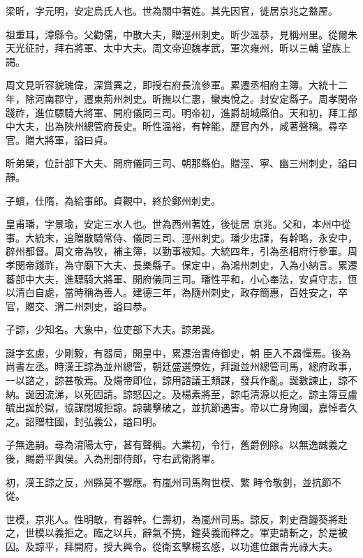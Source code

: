 \begin{pinyinscope}
 梁昕，字元明，安定烏氏人也。世為關中著姓。其先因官，徙居京兆之盩厔。



 祖重耳，漳縣令。父勸儒，中散大夫，贈涇州刺史。昕少溫恭，見稱州里。從爾朱天光征討，拜右將軍、太中大夫。周文帝迎魏孝武，軍次雍州，昕以三輔
 望族上謁。



 周文見昕容貌瑰偉，深賞異之，即授右府長流參軍。累遷丞相府主簿。大統十二年，除河南郡守，遷東荊州刺史。昕撫以仁惠，蠻夷悅之。封安定縣子。周孝閔帝踐祚，進位驃騎大將軍、開府儀同三司。明帝初，進爵胡城縣伯。天和初，拜工部中大夫，出為陜州總管府長史。昕性溫裕，有幹能，歷官內外，咸著聲稱。尋卒官。贈大將軍，謚曰貞。



 昕弟榮，位計部下大夫、開府儀同三司、朝那縣伯。贈涇、寧、幽三州刺史，謚曰靜。



 子蠙，仕隋，為給事郎。貞觀中，終於鄭州刺史。



 皇甫璠，字景瑜，安定三水人也。世為西州著姓，後徙居
 京兆。父和，本州中從事。大統末，追贈散騎常侍、儀同三司、涇州刺史。璠少忠謹，有幹略，永安中，辟州都督。周文帝為牧，補主簿，以勤事被知。大統四年，引為丞相府行參軍。周孝閔帝踐祚，為守廟下大夫、長樂縣子。保定中，為鴻州刺史，入為小納言。累遷蕃部中大夫，進驃騎大將軍、開府儀同三司。璠性平和，小心奉法，安貞守志，恆以清白自處，當時稱為善人。建德三年，為隨州刺史，政存簡惠，百姓安之，卒官，贈交、渭二州刺史，謚曰恭。



 子諒，少知名。大象中，位吏部下大夫。諒弟誕。



 誕字玄慮，少剛毅，有器局，開皇中，累遷治書侍御史，朝
 臣入不肅憚焉。後為尚書左丞。時漢王諒為並州總管，朝廷盛選僚佐，拜誕並州總管司馬，總府政事，一以諮之，諒甚敬焉。及煬帝即位，諒用諮議王頍謀，發兵作亂。誕數諫止，諒不納。誕因流涕，以死固請。諒怒囚之。及楊素將至，諒屯清源以拒之。諒主簿豆盧毓出誕於獄，協謀閉城拒諒。諒襲擊破之，並抗節遇害。帝以亡身殉國，嘉悼者久之。詔贈柱國，封弘義公，謚曰明。



 子無逸嗣。尋為淯陽太守，甚有聲稱。大業初，令行，舊爵例除。以無逸誠義之後，賜爵平輿侯。入為刑部侍郎，守右武衛將軍。



 初，漢王諒之反，州縣莫不響應。有嵐州司馬陶世模、繁
 畤令敬釗，並抗節不從。



 世模，京兆人。性明敏，有器幹。仁壽初，為嵐州司馬。諒反，刺史喬鐘葵將赴之，世模以義拒之。臨之以兵，辭氣不撓，鐘葵義而釋之。軍吏請斬之，於是被囚。及諒平，拜開府，授大興令。從衛玄擊楊玄感，以功進位銀青光祿大夫。




\end{pinyinscope}
